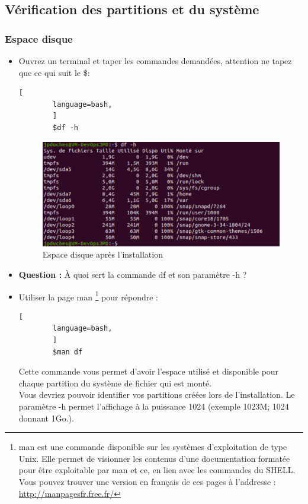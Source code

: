 	\subsection{Vérification des partitions et du système}
	
	\subsubsection{Espace disque}
	\begin{itemize}
		\item  Ouvrez un terminal et taper les commandes demandées, attention ne tapez que ce qui suit le \$:
		
		
		\begin{lstlisting}[
		language=bash,
		]
		$df -h
		\end{lstlisting}
		\begin{figure}[!htb]
			\centering
			\includegraphics[scale=0.6]{images/captureDF}
			\caption{Espace disque après l'installation}
			\label{df}
		\end{figure}
		
		\item  \textbf{Question :} À quoi sert la commande {\color{blue}df} et son paramètre {\color{blue}-h} ?
		\item Utiliser la page {\color{blue}man} \footnote{man est une commande disponible sur les systèmes d'exploitation de type Unix. Elle permet de visionner les contenus d'une documentation formatée pour être exploitable par man et ce, en lien avec les commandes du SHELL. Vous pouvez trouver une version en français de ces pages à l'addresse : \url{http://manpagesfr.free.fr/}} pour répondre :
		\begin{lstlisting}[
		language=bash,
		]
		$man df
		\end{lstlisting}
		
		Cette commande vous permet d'avoir l'espace utilisé et disponible pour chaque partition du système de fichier qui est monté.\\
		Vous devriez pouvoir identifier vos partitions créées lors de l'installation.
		Le paramètre -h permet l'affichage à la puissance 1024 (exemple 1023M; 1024 donnant 1Go.).
		

\end{itemize}
